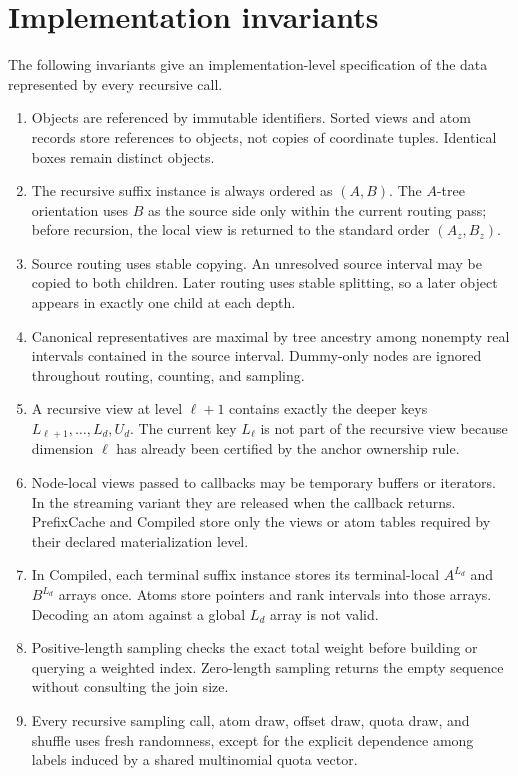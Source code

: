 \documentclass[11pt]{article}
\theoremstyle{definition}
\begin{document}
\section{Implementation invariants}
\label{sec:invariants}

The following invariants give an implementation-level specification of the data represented by every recursive call.
\begin{enumerate}[leftmargin=1.6em,itemsep=2pt,topsep=2pt]
\item Objects are referenced by immutable identifiers.  Sorted views and atom records store references to objects, not copies of coordinate tuples.  Identical boxes remain distinct objects.
\item The recursive suffix instance is always ordered as $(A,B)$.  The $A$-tree orientation uses $B$ as the source side only within the current routing pass; before recursion, the local view is returned to the standard order $(A_z,B_z)$.
\item Source routing uses stable copying.  An unresolved source interval may be copied to both children.  Later routing uses stable splitting, so a later object appears in exactly one child at each depth.
\item Canonical representatives are maximal by tree ancestry among nonempty real intervals contained in the source interval.  Dummy-only nodes are ignored throughout routing, counting, and sampling.
\item A recursive view at level $\ell+1$ contains exactly the deeper keys $L_{\ell+1},\ldots,L_d,U_d$.  The current key $L_\ell$ is not part of the recursive view because dimension $\ell$ has already been certified by the anchor ownership rule.
\item Node-local views passed to callbacks may be temporary buffers or iterators.  In the streaming variant they are released when the callback returns.  PrefixCache and Compiled store only the views or atom tables required by their declared materialization level.
\item In Compiled, each terminal suffix instance stores its terminal-local $A^{L_d}$ and $B^{L_d}$ arrays once.  Atoms store pointers and rank intervals into those arrays.  Decoding an atom against a global $L_d$ array is not valid.
\item Positive-length sampling checks the exact total weight before building or querying a weighted index.  Zero-length sampling returns the empty sequence without consulting the join size.
\item Every recursive sampling call, atom draw, offset draw, quota draw, and shuffle uses fresh randomness, except for the explicit dependence among labels induced by a shared multinomial quota vector.
\end{enumerate}
\end{document}
